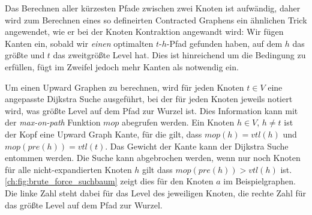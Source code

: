 Das Berechnen aller kürzesten Pfade zwischen zwei Knoten ist aufwändig, daher wird zum Berechnen eines so defineirten Contracted Graphens ein ähnlichen Trick angewendet, wie er bei der Knoten Kontraktion angewandt wird:
Wir fügen Kanten ein, sobald wir \emph{einen} optimalten $t$-$h$-Pfad gefunden haben, auf dem $h$ das größte und $t$ das zweitgrößte Level hat.
Dies ist hinreichend um die Bedingung zu erfüllen, fügt im Zweifel jedoch mehr Kanten als notwendig ein.

Um einen Upward Graphen zu berechnen, wird für jeden Knoten $t \in V$ eine angepasste Dijkstra Suche ausgeführt, bei der für jeden Knoten jeweils notiert wird, was größte Level auf dem Pfad zur Wurzel ist.
Dies Information kann mit der \emph{max-on-path} Funktion ${mop}$ abegrufen werden.
Ein Knoten $h \in V$, $h \neq t$ ist der Kopf eine Upward Graph Kante, für die gilt, dass ${mop}(h) = {vtl}(h)$ und ${mop}({pre}(h)) = {vtl}(t)$.
Das Gewicht der Kante kann der Dijkstra Suche entommen werden.
Die Suche kann abgebrochen werden, wenn nur noch Knoten für alle nicht-expandierten Knoten $h$ gilt dass ${mop}({pre}(h)) > {vtl}(h)$ ist.
\autoref{ch:fig:brute_force_suchbaum} zeigt dies für den Knoten $a$ im Beispielgraphen.
Die linke Zahl steht dabei für das Level des jeweiligen Knoten, die rechte Zahl für das größte Level auf dem Pfad zur Wurzel.

